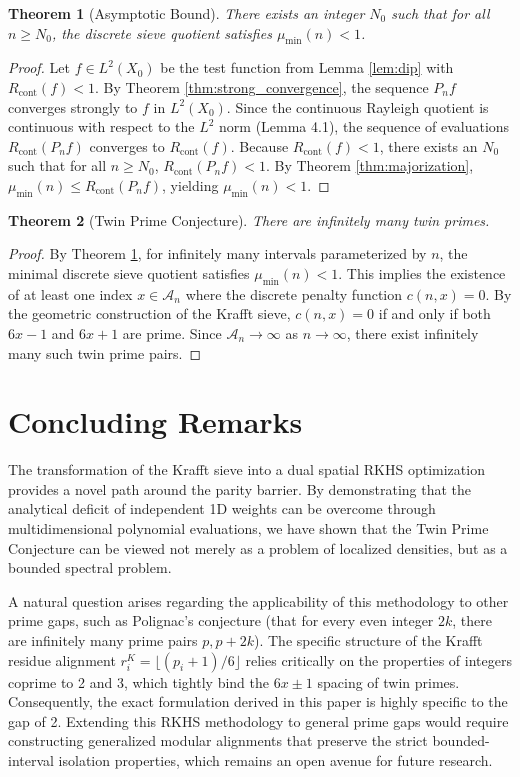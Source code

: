 \documentclass{aomart}
\newtheorem{theorem}{Theorem}[section]
\theoremstyle{definition}
\newcommand{\mathcalA}{\mathcal{A}}
\begin{document}
\begin{theorem}[Asymptotic Bound] \label{thm:asymptotic}
There exists an integer $N_0$ such that for all $n \ge N_0$, the discrete sieve quotient satisfies
$\mu_{\min}(n) < 1$.
\end{theorem}
\begin{proof}
Let $f \in L^2(X_0)$ be the test function from Lemma \ref{lem:dip} with $R_{\text{cont}}(f) < 1$.
By Theorem \ref{thm:strong_convergence}, the sequence $P_n f$ converges strongly to $f$ in
$L^2(X_0)$. Since the continuous Rayleigh quotient is continuous with respect to the $L^2$ norm
(Lemma 4.1), the sequence of evaluations $R_{\text{cont}}(P_n f)$ converges to $R_{\text{cont}}(f)$.
Because $R_{\text{cont}}(f) < 1$, there exists an $N_0$ such that for all $n \ge N_0$,
$R_{\text{cont}}(P_n f) < 1$. By Theorem \ref{thm:majorization}, $\mu_{\min}(n) \le
R_{\text{cont}}(P_n f)$, yielding $\mu_{\min}(n) < 1$.
\end{proof}

\begin{theorem}[Twin Prime Conjecture] \label{thm:tpc}
There are infinitely many twin primes.
\end{theorem}
\begin{proof}
By Theorem \ref{thm:asymptotic}, for infinitely many intervals parameterized by $n$, the minimal
discrete sieve quotient satisfies $\mu_{\min}(n) < 1$. This implies the existence of at least one
index $x \in \mathcalA_n$ where the discrete penalty function $c(n, x) = 0$. By the geometric
construction of the Krafft sieve, $c(n, x) = 0$ if and only if both $6x-1$ and $6x+1$ are
prime. Since $\mathcalA_n \to \infty$ as $n \to \infty$, there exist infinitely many such twin
prime pairs.
\end{proof}

\section{Concluding Remarks} \label{sec:conclusion}

The transformation of the Krafft sieve into a dual spatial RKHS optimization provides a novel path
around the parity barrier. By demonstrating that the analytical deficit of independent 1D weights
can be overcome through multidimensional polynomial evaluations, we have shown that the Twin Prime
Conjecture can be viewed not merely as a problem of localized densities, but as a bounded spectral
problem.

A natural question arises regarding the applicability of this methodology to other prime gaps, such
as Polignac's conjecture (that for every even integer $2k$, there are infinitely many prime pairs
$p, p+2k$). The specific structure of the Krafft residue alignment $r^K_i = \lfloor(p_i + 1)/6\rfloor$
relies critically on the properties of integers coprime to 2 and 3, which tightly bind the
$6x \pm 1$ spacing of twin primes. Consequently, the exact formulation derived in this paper is
highly specific to the gap of 2. Extending this RKHS methodology to general prime gaps would require
constructing generalized modular alignments that preserve the strict bounded-interval isolation
properties, which remains an open avenue for future research.
\end{document}
